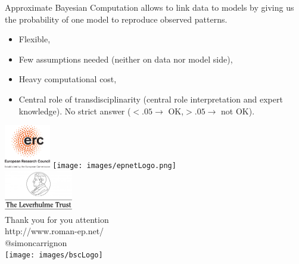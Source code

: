 \documentclass[10pt, notes=show]{beamer}
\begin{document}
\begin{frame}
    Approximate Bayesian Computation allows to link data to models by giving us the probability of one model to reproduce observed patterns.
    \begin{itemize}
        \item<+-> Flexible,
        \item<+-> Few assumptions needed (neither on data nor model side),
        \item<+-> Heavy computational cost,
        \item<+-> Central role of transdisciplinarity (central role interpretation and expert knowledge). No strict answer ($<.05 \rightarrow$ OK,$>.05 \rightarrow$ not OK).
    \end{itemize}
    
\end{frame}

\begin{frame}
	\begin{center}
		\includegraphics[width=2cm]{images/LOGO-ERC.jpg} \hfil	\texttt{[image: images/epnetLogo.png]}\\
		\includegraphics[width=3cm]{images/leverhulme}\\
		\vspace{.5cm}
		Thank you for you attention\\
		\vspace{.5cm}
		\scriptsize
			http://www.roman-ep.net/\\
			@simoncarrignon\\
		\vspace{.5cm}
		\texttt{[image: images/bscLogo]}\\
	\end{center}


\end{frame}
\end{document}
